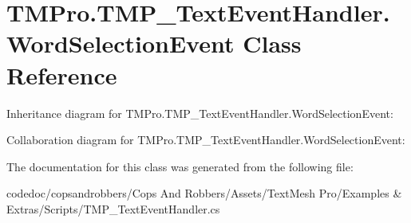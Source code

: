 \hypertarget{classTMPro_1_1TMP__TextEventHandler_1_1WordSelectionEvent}{}\section{T\+M\+Pro.\+T\+M\+P\+\_\+\+Text\+Event\+Handler.\+Word\+Selection\+Event Class Reference}
\label{classTMPro_1_1TMP__TextEventHandler_1_1WordSelectionEvent}


Inheritance diagram for T\+M\+Pro.\+T\+M\+P\+\_\+\+Text\+Event\+Handler.\+Word\+Selection\+Event\+:


Collaboration diagram for T\+M\+Pro.\+T\+M\+P\+\_\+\+Text\+Event\+Handler.\+Word\+Selection\+Event\+:


The documentation for this class was generated from the following file\+:\begin{DoxyCompactItemize}
\item 
codedoc/copsandrobbers/\+Cops And Robbers/\+Assets/\+Text\+Mesh Pro/\+Examples \& Extras/\+Scripts/T\+M\+P\+\_\+\+Text\+Event\+Handler.\+cs\end{DoxyCompactItemize}
